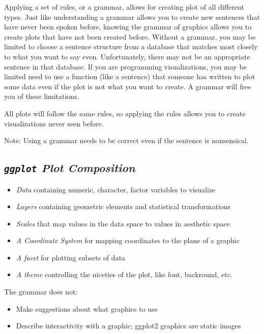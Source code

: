 \documentclass[
  letterpaper,
  DIV=11,
  numbers=noendperiod]{scrartcl}
\providecommand{\tightlist}{%
  \setlength{\itemsep}{0pt}\setlength{\parskip}{0pt}}\usepackage{longtable,booktabs,array}
\begin{document}
Applying a set of rules, or a grammar, allows for creating plot of all
different types. Just like understanding a grammar allows you to create
new sentences that have never been spoken before, knowing the grammar of
graphics allows you to create plots that have not been created before.
Without a grammar, you may be limited to choose a sentence structure
from a database that matches most closely to what you want to say even.
Unfortunately, there may not be an appropriate sentence in that
database. If you are programming visualizations, you may be limited need
to use a function (like a sentence) that someone has written to plot
some data even if the plot is not what you want to create. A grammar
will free you of these limitations.

All plots will follow the same rules, so applying the rules allows you
to create visualizations never seen before.

Note: Using a grammar needs to be correct even if the sentence is
nonsensical.

\hypertarget{ggplot-plot-composition}{%
\subsection{\texorpdfstring{\emph{\texttt{ggplot} Plot
Composition}}{ggplot Plot Composition}}\label{ggplot-plot-composition}}

\begin{itemize}
\tightlist
\item
  \emph{Data} containing numeric, character, factor variables to
  visualize
\item
  \emph{Layers} containing geometric elements and statistical
  transformations
\item
  \emph{Scales} that map values in the data space to values in aesthetic
  space
\item
  \emph{A Coordinate System} for mapping coordinates to the plane of a
  graphic
\item
  \emph{A facet} for plotting subsets of data
\item
  \emph{A theme} controlling the niceties of the plot, like font,
  backround, etc.
\end{itemize}

The grammar does not:

\begin{itemize}
\tightlist
\item
  Make suggestions about what graphics to use
\item
  Describe interactivity with a graphic; ggplot2 graphics are static
  images
\end{itemize}
\end{document}
